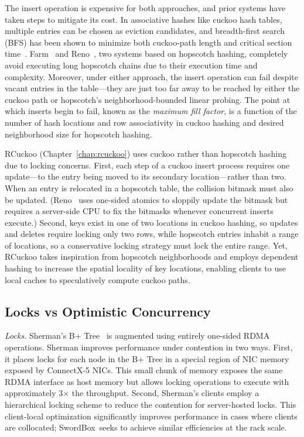 \documentclass[12pt]{ucsddissertation}
\newcommand{\sword}{SwordBox}
\begin{document}
The insert operation is expensive for both approaches, and prior systems have taken steps to
mitigate its cost. In associative hashes like cuckoo hash tables, multiple entries can be chosen as
eviction candidates, and breadth-first search (BFS) has been shown to minimize both cuckoo-path
length and critical section time~\cite{memc3,cuckoo-improvements}. Farm~\cite{farm} and
Reno~\cite{reno}, two systems based on hopscotch hashing, completely avoid executing long hopscotch
chains due to their execution time and complexity. Moreover, under either approach, the insert
operation can fail despite vacant entries in the table—they are just too far away to be reached by
either the cuckoo path or hopscotch’s neighborhood-bounded linear probing. The point at which
inserts begin to fail, known as the \emph{maximum fill factor}, is a function of the number of hash
locations and row associativity in cuckoo hashing and desired neighborhood size for hopscotch
hashing.


RCuckoo (Chapter~\ref{chap:rcuckoo}) uses cuckoo rather than hopscotch hashing due to locking
concerns. First, each step of a cuckoo insert process requires one update—to the entry being moved
to its secondary location—rather than two. When an entry is relocated in a hopscotch table, the
collision bitmask must also be updated. (Reno~\cite{reno} uses one-sided atomics to sloppily update
the bitmask but requires a server-side CPU to fix the bitmasks whenever concurrent inserts execute.)
Second, keys exist in one of two locations in cuckoo hashing, so updates and deletes require locking
only two rows, while hopscotch entries inhabit a range of locations, so a conservative locking
strategy must lock the entire range. Yet, RCuckoo takes inspiration from hopscotch neighborhoods and
employs dependent hashing to increase the spatial locality of key locations, enabling clients to use
local caches to speculatively compute cuckoo paths.



\subsection{Locks vs Optimistic Concurrency}
\label{sec:lock-vs-op}

\emph{Locks.} Sherman's B+ Tree~\cite{sherman} is augmented using entirely one-sided RDMA
operations. Sherman improves performance under contention in two ways. First, it places locks for
each node in the B+ Tree in a special region of NIC memory exposed by ConnectX-5 NICs. This small
chunk of memory exposes the same RDMA interface as host memory but allows locking operations to
execute with approximately 3$\times$ the throughput. Second, Sherman's clients employ a hierarchical
locking scheme to reduce the contention for server-hosted locks. This client-local optimization
significantly improves performance in cases where clients are collocated; \sword\ seeks to achieve
similar efficiencies at the rack scale.
\end{document}

